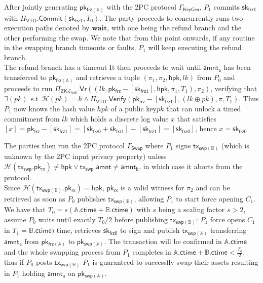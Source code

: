 \documentclass{article}      	%
\begin{document}
After jointly generating $\mathsf{pk_{frz(\mathbb{A})}}$ with the 2PC protocol $\Gamma_{\mathsf{KeyGen}}$, $P_1$ commits $\mathsf{sk_{frz1}}$ with $\Pi_{\mathsf{VTD}}.\mathsf{Commit}(\mathsf{sk_{frz1}}, T_0)$. 
The party proceeds to concurrently runs two execution paths denoted by $\textbf{wait}$, with one being the refund branch and the other performing the swap. We note that from this point onwards, if any routine in the swapping branch timeouts or faults, $P_1$ will keep executing the refund branch. \\

The refund branch has a timeout 
It then proceeds to wait until $\mathsf{amnt_a}$ has been transferred to $\mathsf{pk_{frz(\mathbb{A})}}$ and retrieves a tuple $(\pi_1, \pi_2, \mathsf{hpk}, lk)$ from $P_0$ and proceeds to run $\Pi_{\mathsf{ZK}\mathcal{L}_{\mathsf{lock}}}.\mathsf{Vr}((lk, \mathsf{pk_{frz}} - [\mathsf{sk_{frz1}}], \mathsf{hpk}, \pi_1, T_1), \pi_2)$, verifying that $\exists(pk) \:\: \text{s.t} \:\: \mathcal{H}(pk) = h \land \Pi_\mathsf{VTD}.\mathsf{Verify}(\mathsf{pk_{frz}} - [\mathsf{sk_{frz1}}], (lk \oplus pk), \pi, T_1)$. Thus $P_1$ now knows the hash value $hpk$ of a public key$pk$ that can unlock a timed commitment from $lk$ which holds a discrete log value $x$ that satisfies  $[x] = \mathsf{pk_{frz}} - [\mathsf{sk_{frz1}}] = [\mathsf{sk_{frz0}} + \mathsf{sk_{frz1}}] - [\mathsf{sk_{frz1}}] = [\mathsf{sk_{frz0}}]$, hence $x = \mathsf{sk_{frz0}}$.

The parties then run the 2PC protocol $\Gamma_{\mathsf{Swap}}$ where $P_1$ signs $\mathsf{tx_{swp(\mathbb{B})}}$ (which is unknown by the 2PC input privacy property) unless $\mathcal{H}(\mathsf{tx_{swp}}.\mathsf{pk_{rx}}) \neq \mathsf{hpk} \lor  \mathsf{tx_{swp}}.\mathsf{amnt} \neq \mathsf{amnt_b}$, in which case it aborts from the protocol. \\

Since $\mathcal{H}(\mathsf{tx_{swp(\mathbb{B})}}.\mathsf{pk_{rx}}) = \mathsf{hpk}$,  $\mathsf{pk_{rx}}$ is a valid witness for $\pi_2$ and can be retrieved as soon as $P_0$ publishes $\mathsf{tx_{swp(\mathbb{B})}}$, allowing $P_1$ to start force opening $C_1$. \\
We have that $T_0 = s(\mathbb{A}.\mathsf{ctime} + \mathbb{B}.\mathsf{ctime})$ with $s$ being a scaling factor $s > 2$, assume $P_0$ waits until exactly $T_0/2$ before publishing $\mathsf{tx_{swp(\mathbb{B})}}$: $P_1$ force opens $C_1$ in $T_1 = \mathbb{B}.\mathsf{ctime})$ time, retrieves $\mathsf{sk_{frz0}}$ to sign and publish $\mathsf{tx_{swp(\mathbb{A})}}$ transferring $\mathsf{amnt_a}$ from $\mathsf{pk_{frz(\mathbb{A})}}$ to $\mathsf{pk_{swp(\mathbb{A})}}$. The transaction will be confirmed in $\mathbb{A}.\mathsf{ctime}$ and the whole swapping process from $P_1$ completes in $\mathbb{A}.\mathsf{ctime} + \mathbb{B}.\mathsf{ctime} < \frac{T_0}{2}$, thus if $P_0$ posts $\mathsf{tx_{swp(\mathbb{B})}}$ $P_1$ is guaranteed to successfly swap their assets resulting in $P_1$ holding $\mathsf{amnt_a}$ on $\mathsf{pk_{swp(\mathbb{A})}}$. \\
\end{document}
